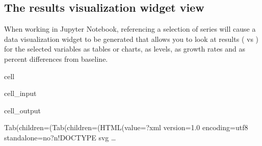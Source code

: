 \documentclass[letterpaper,10pt,english]{jupyterBook}
\begin{document}
\subsection{The results visualization widget view}
\label{\detokenize{content/05_WBModels/ScenarioAnalysis:the-results-visualization-widget-view}}
\sphinxAtStartPar
When working in Jupyter Notebook, referencing a selection of series will cause a data visualization widget to be generated that allows you to look at results ( vs ) for the selected variables as tables or charts, as levels, as growth rates and as percent differences from baseline.

\begin{sphinxuseclass}{cell}\begin{sphinxVerbatimInput}

\begin{sphinxuseclass}{cell_input}
\begin{sphinxVerbatim}[commandchars=\\\{\}]
\PYG{p}{[}\PYG{p}{]}
\end{sphinxVerbatim}

\end{sphinxuseclass}\end{sphinxVerbatimInput}
\begin{sphinxVerbatimOutput}

\begin{sphinxuseclass}{cell_output}
\begin{sphinxVerbatim}[commandchars=\\\{\}]
Tab(children=(Tab(children=(HTML(value=\PYGZsq{}\PYGZlt{}?xml version=\PYGZdq{}1.0\PYGZdq{} encoding=\PYGZdq{}utf\PYGZhy{}8\PYGZdq{} standalone=\PYGZdq{}no\PYGZdq{}?\PYGZgt{}\PYGZbs{}n\PYGZlt{}!DOCTYPE svg …
\end{sphinxVerbatim}

\begin{sphinxVerbatim}[commandchars=\\\{\}]

\end{sphinxVerbatim}

\end{sphinxuseclass}\end{sphinxVerbatimOutput}

\end{sphinxuseclass}
\sphinxstepscope
\end{document}
